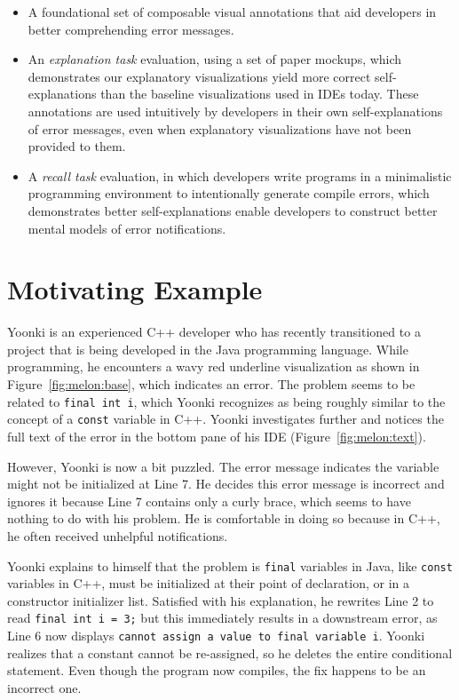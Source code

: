 \documentclass[conference]{IEEEtran}
\begin{document}
\begin{itemize}
\item A foundational set of composable visual annotations that aid developers in better comprehending error messages.
\item An \textit{explanation task} evaluation, using a set of paper mockups, which demonstrates our explanatory visualizations yield more correct self-explanations than the baseline visualizations used in IDEs today. These annotations are used intuitively by developers in their own self-explanations of error messages, even when explanatory visualizations have not been provided to them.
\item A \textit{recall task} evaluation, in which developers write programs in a minimalistic programming environment to intentionally generate compile errors, which demonstrates better self-explanations enable developers to construct better mental models of error notifications.
\end{itemize}

\section{Motivating Example}

Yoonki is an experienced C++ developer who has recently transitioned to a project that is being developed in the Java programming language. While programming, he encounters a wavy red underline visualization as shown in Figure~\ref{fig:melon:base}, which indicates an error. The problem seems to be related to \texttt{final int i}, which Yoonki recognizes as being roughly similar to the concept of a \texttt{const} variable in C++. Yoonki investigates further and notices the full text of the error in the bottom pane of his IDE (Figure~\ref{fig:melon:text}). 

However, Yoonki is now a bit puzzled. The error message indicates the variable might not be initialized at Line 7. He decides this error message is incorrect and ignores it because Line 7 contains only a curly brace, which seems to have nothing to do with his problem. He is comfortable in doing so because in C++, he often received unhelpful notifications.

Yoonki explains to himself that the problem is \texttt{final} variables in Java, like \texttt{const} variables in C++, must be initialized at their point of declaration, or in a constructor initializer list. Satisfied with his explanation, he rewrites Line 2 to read \texttt{final int i = 3;} but this immediately results in a downstream error, as Line 6 now displays \texttt{cannot assign a value to final variable i}. Yoonki realizes that a constant cannot be re-assigned, so he deletes the entire conditional statement. Even though the program now compiles, the fix happens to be an incorrect one.
\end{document}
